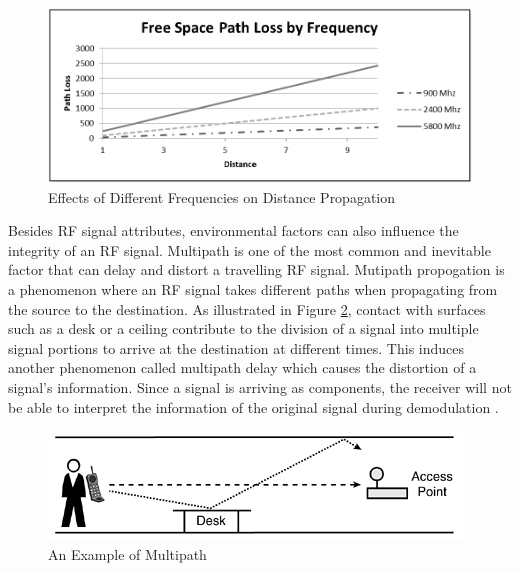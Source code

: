 \medskip
\begin{figure}[H]
\centering
    \includegraphics[width=\linewidth]{./images/FSP.png}
    \caption{Effects of Different Frequencies on Distance Propagation}
    \label{fsp}
\end{figure}

\medskip
Besides RF signal attributes, environmental factors can also influence the integrity of an RF signal. Multipath is one of the most common and inevitable factor that can delay and distort a travelling RF signal. Mutipath propogation is a phenomenon where an RF signal takes different paths when propagating from the source to the destination. As illustrated in Figure \ref{multipath}, contact with surfaces such as a desk or a ceiling contribute to the division of a signal into multiple signal portions to arrive at the destination at different times. This induces another phenomenon called multipath delay which causes the distortion of a signal's information. Since a signal is arriving as components, the receiver will not be able to interpret the information of the original signal during demodulation \cite{R2-4-1}.

\medskip
\begin{figure}[H]
\centering
    \includegraphics[width=\linewidth]{./images/multipath.png}
    \caption{An Example of Multipath}
    \label{multipath}
\end{figure}

\pagebreak
